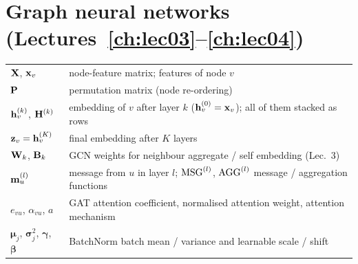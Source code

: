 \section{Graph neural networks (Lectures~\ref{ch:lec03}--\ref{ch:lec04})}
\begin{tabularx}{\textwidth}{@{}l X@{}}
  \toprule
  $\mathbf{X}$, $\mathbf{x}_v$ & node-feature matrix; features of node $v$ \\
  $\mathbf{P}$ & permutation matrix (node re-ordering) \\
  $\mathbf{h}_v^{(k)}$, $\mathbf{H}^{(k)}$ & embedding of $v$ after layer $k$ ($\mathbf{h}_v^{(0)}=\mathbf{x}_v$); all of them stacked as rows \\
  $\mathbf{z}_v=\mathbf{h}_v^{(K)}$ & final embedding after $K$ layers \\
  $\mathbf{W}_k$, $\mathbf{B}_k$ & GCN weights for neighbour aggregate / self embedding (Lec.~3) \\
  $\mathbf{m}_u^{(l)}$ & message from $u$ in layer $l$; $\operatorname{MSG}^{(l)}$, $\operatorname{AGG}^{(l)}$ message / aggregation functions \\
  $e_{vu}$, $\alpha_{vu}$, $a$ & GAT attention coefficient, normalised attention weight, attention mechanism \\
  $\bm{\mu}_j$, $\bm{\sigma}_j^2$, $\bm{\gamma}$, $\bm{\beta}$ & BatchNorm batch mean / variance and learnable scale / shift \\
  \bottomrule
\end{tabularx}


